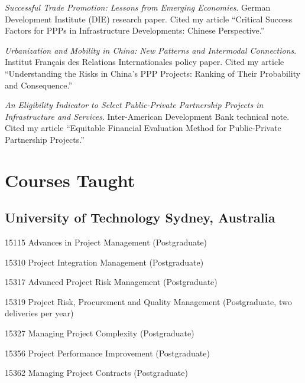 \documentclass[11pt,a4paper]{report} %
\begin{document}
\begin{tablist}
        \item[2013] \tab{}\textit{Successful Trade Promotion: Lessons from Emerging Economies}. German Development Institute (DIE) research paper. Cited my article “Critical Success Factors for PPPs in Infrastructure Developments: Chinese Perspective.”  

        \item[2013] \tab{}\textit{Urbanization and Mobility in China: New Patterns and Intermodal Connections}. Institut Français des Relations Internationales policy paper. Cited my article “Understanding the Risks in China's PPP Projects: Ranking of Their Probability and Consequence.”  
    
        \item[2011] \tab{}\textit{An Eligibility Indicator to Select Public-Private Partnership Projects in Infrastructure and Services}. Inter-American Development Bank technical note. Cited my article “Equitable Financial Evaluation Method for Public-Private Partnership Projects.”  
    
    \end{tablist}

    

    \section*{Courses Taught}

    \subsection*{University of Technology Sydney, Australia}

    \begin{tablist}

        \item[2019--26] \tab{}15115 Advances in Project Management (Postgraduate)

        \item[2023] \tab{}15310	Project Integration Management (Postgraduate)
        
        \item[2017--26] \tab{}15317 Advanced Project Risk Management (Postgraduate) 
        
        \item[2016--26] \tab{}15319 Project Risk, Procurement and Quality Management (Postgraduate, two deliveries per year) 
        
        \item[2017--24] \tab{}15327 Managing Project Complexity (Postgraduate) 
        
        \item[2017] \tab{}15356 Project Performance Improvement (Postgraduate) 
        
        \item[2023--26] \tab{}15362 Managing Project Contracts (Postgraduate) 

    \end{tablist}
\end{document}
